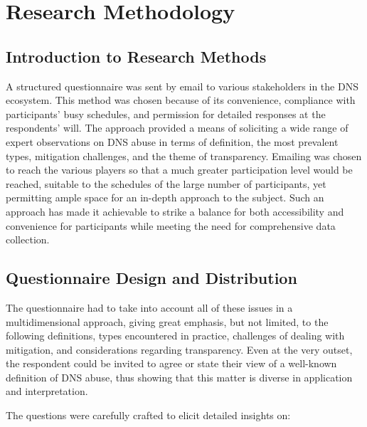 \chapter{Research Methodology}

\section{Introduction to Research Methods} 

A structured questionnaire was sent by email to various stakeholders in the DNS ecosystem. This method was chosen because of its convenience, compliance with participants' busy schedules, and permission for detailed responses at the respondents' will. The approach provided a means of soliciting a wide range of expert observations on DNS abuse in terms of definition, the most prevalent types, mitigation challenges, and the theme of transparency. Emailing was chosen to reach the various players so that a much greater participation level would be reached, suitable to the schedules of the large number of participants, yet permitting ample space for an in-depth approach to the subject. Such an approach has made it achievable to strike a balance for both accessibility and convenience for participants while meeting the need for comprehensive data collection.



\section{Questionnaire Design and Distribution} 

The questionnaire had to take into account all of these issues in a multidimensional approach, giving great emphasis, but not limited, to the following definitions, types encountered in practice, challenges of dealing with mitigation, and considerations regarding transparency. Even at the very outset, the respondent could be invited to agree or state their view of a well-known definition of DNS abuse, thus showing that this matter is diverse in application and interpretation.

The questions were carefully crafted to elicit detailed insights on:

